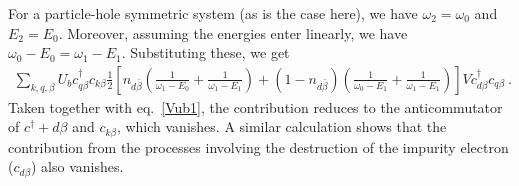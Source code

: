 For a particle-hole symmetric system (as is the case here), we have \(\omega_2 = \omega_0\) and \(E_2 = E_0\). Moreover, assuming the energies enter linearly, we have \(\omega_0 -E_0 = \omega_1 - E_1\). Substituting these, we get
\begin{equation}\begin{aligned}\label{Vub2}
	\sum_{k,q,\beta}U_b c^\dagger_{q\beta}c_{k\beta} \frac{1}{2}\left[n_{d\bar\beta}\left(\frac{1}{\omega_1 - E_0} + \frac{1}{\omega_1 - E_1}\right) + (1 - n_{d\bar\beta})\left(\frac{1}{\omega_0 - E_1} + \frac{1}{\omega_1 - E_1}\right)\right] Vc^\dagger_{d\beta}c_{q\beta}~.
\end{aligned}\end{equation}
Taken together with eq.~\ref{Vub1}, the contribution reduces to the anticommutator of \(c^\dagger+{d\beta}\) and \(c_{k\beta}\), which vanishes. A similar calculation shows that the contribution from the processes involving the destruction of the impurity electron (\(c_{d\beta}\)) also vanishes.

